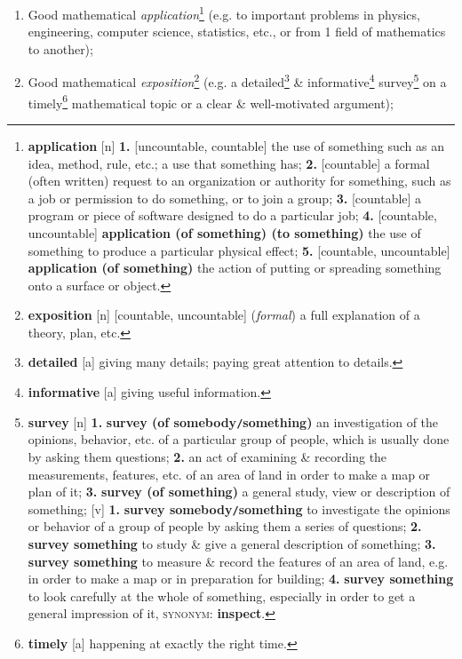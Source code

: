 \documentclass[oneside]{book}
\numberwithin{equation}{section}
\begin{document}
\begin{enumerate}
	\item Good mathematical \textit{application}\footnote{\textbf{application} [n] \textbf{1.} [uncountable, countable] the use of something such as an idea, method, rule, etc.; a use that something has; \textbf{2.} [countable] a formal (often written) request to an organization or authority for something, such as a job or permission to do something, or to join a group; \textbf{3.} [countable] a program or piece of software designed to do a particular job; \textbf{4.} [countable, uncountable] \textbf{application (of something) (to something)} the use of something to produce a particular physical effect; \textbf{5.} [countable, uncountable] \textbf{application (of something)} the action of putting or spreading something onto a surface or object.} (e.g. to important problems in physics, engineering, computer science, statistics, etc., or from 1 field of mathematics to another);
	\item Good mathematical \textit{exposition}\footnote{\textbf{exposition} [n] [countable, uncountable] (\textit{formal}) a full explanation of a theory, plan, etc.} (e.g. a detailed\footnote{\textbf{detailed} [a] giving many details; paying great attention to details.} \& informative\footnote{\textbf{informative} [a] giving useful information.} survey\footnote{\textbf{survey} [n] \textbf{1.} \textbf{survey (of somebody\texttt{/}something)} an investigation of the opinions, behavior, etc. of a particular group of people, which is usually done by asking them questions; \textbf{2.} an act of examining \& recording the measurements, features, etc. of an area of land in order to make a map or plan of it; \textbf{3.} \textbf{survey (of something)} a general study, view or description of something; [v] \textbf{1.} \textbf{survey somebody\texttt{/}something} to investigate the opinions or behavior of a group of people by asking them a series of questions; \textbf{2.} \textbf{survey something} to study \& give a general description of something; \textbf{3.} \textbf{survey something} to measure \& record the features of an area of land, e.g. in order to make a map or in preparation for building; \textbf{4.} \textbf{survey something} to look carefully at the whole of something, especially in order to get a general impression of it, \textsc{synonym}: \textbf{inspect}.} on a timely\footnote{\textbf{timely} [a] happening at exactly the right time.} mathematical topic or a clear \& well-motivated argument);

\end{enumerate}
\end{document}
